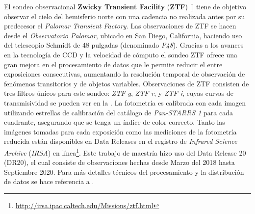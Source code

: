 El sondeo observacional \textbf{Zwicky Transient Facility} (\textbf{ZTF})
[] tiene de
objetivo observar el cielo del hemisferio norte con una cadencia no realizada
antes por su predecesor el \textit{Palomar Transient Factory}. Las observaciones
de ZTF se hacen desde el \textit{Observatorio Palomar}, ubicado en San Diego,
California, haciendo uso del telescopio Schmidt de 48 pulgadas (denominado
\textit{P48}). Gracias a los avances en la tecnología de CCD y la velocidad de
cómputo el sondeo ZTF ofrece una gran mejora en el procesamiento de datos que le
permite reducir el  entre exposiciones consecutivas,
aumentando la resolución temporal de observación de fenómenos transitorios y de
objetos variables. Observaciones de ZTF consisten de tres filtros únicos para
este sondeo: \textit{ZTF-g}, \textit{ZTF-r}, y \textit{ZTF-i}, cuyas curvas de
transmisividad se pueden ver en la . La
fotometría es calibrada con cada imagen utilizando estrellas de calibración del
catálogo de \textit{Pan-STARRS 1} para cada cuadrante, asegurando que se tenga
un índice de color correcto. Tanto las imágenes tomadas para cada exposición
como las mediciones de la fotometría reducida están disponibles en Data Releases
en el registro de \textit{Infrared Science Archive} (\textit{IRSA}) en
línea\footnote{\url{http://irsa.ipac.caltech.edu/Missions/ztf.html}}. Este
trabajo de maestría hizo uso del Data Release 20 (DR20), el cual consiste de
observaciones hechas desde Marzo del 2018 hasta Septiembre 2020. Para más
detalles técnicos del procesamiento y la distribución de datos se hace
referencia a .

